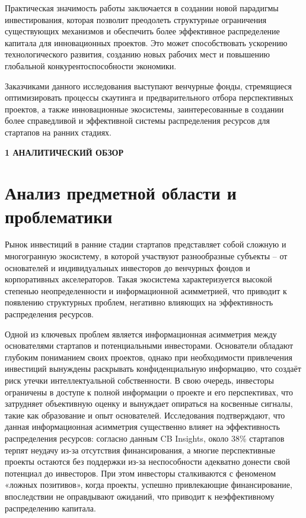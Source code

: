 \documentclass[
    candidate, %
    subf, %
    dotsinheaders=false,
]{disser}
\begin{document}
Практическая значимость работы заключается в создании новой парадигмы инвестирования, которая позволит преодолеть структурные ограничения существующих механизмов и обеспечить более эффективное распределение капитала для инновационных проектов. Это может способствовать ускорению технологического развития, созданию новых рабочих мест и повышению глобальной конкурентоспособности экономики.

Заказчиками данного исследования выступают венчурные фонды, стремящиеся оптимизировать процессы скаутинга и предварительного отбора перспективных проектов, а также инновационные экосистемы, заинтересованные в создании более справедливой и эффективной системы распределения ресурсов для стартапов на ранних стадиях.

\newpage
\begin{center}
  \textbf{1 АНАЛИТИЧЕСКИЙ ОБЗОР }
\end{center}

\section{Анализ предметной области и проблематики}

Рынок инвестиций в ранние стадии стартапов представляет собой сложную и многогранную экосистему, в которой участвуют разнообразные субъекты – от основателей и индивидуальных инвесторов до венчурных фондов и корпоративных акселераторов. Такая экосистема характеризуется высокой степенью неопределенности и информационной асимметрией, что приводит к появлению структурных проблем, негативно влияющих на эффективность распределения ресурсов.

Одной из ключевых проблем является информационная асимметрия между основателями стартапов и потенциальными инвесторами. Основатели обладают глубоким пониманием своих проектов, однако при необходимости привлечения инвестиций вынуждены раскрывать конфиденциальную информацию, что создаёт риск утечки интеллектуальной собственности. В свою очередь, инвесторы ограничены в доступе к полной информации о проекте и его перспективах, что затрудняет объективную оценку и вынуждает опираться на косвенные сигналы, такие как образование и опыт основателей. Исследования подтверждают, что данная информационная асимметрия существенно влияет на эффективность распределения ресурсов: согласно данным CB Insights, около 38\% стартапов терпят неудачу из-за отсутствия финансирования, а многие перспективные проекты остаются без поддержки из-за неспособности адекватно донести свой потенциал до инвесторов. При этом инвесторы сталкиваются с феноменом «ложных позитивов», когда проекты, успешно привлекающие финансирование, впоследствии не оправдывают ожиданий, что приводит к неэффективному распределению капитала.
\end{document}
